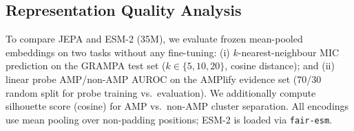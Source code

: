 \subsection{Representation Quality Analysis}
\label{sec:methods_emb}

To compare JEPA and ESM-2 (35M), we evaluate frozen mean-pooled embeddings on
two tasks without any fine-tuning:
(i) $k$-nearest-neighbour MIC prediction on the GRAMPA test set
($k \in \{5, 10, 20\}$, cosine distance); and
(ii) linear probe AMP/non-AMP AUROC on the AMPlify evidence set
(70/30 random split for probe training vs.\ evaluation).
We additionally compute silhouette score (cosine) for AMP vs.\ non-AMP
cluster separation.
All encodings use mean pooling over non-padding positions; ESM-2 is loaded
via \texttt{fair-esm}.

